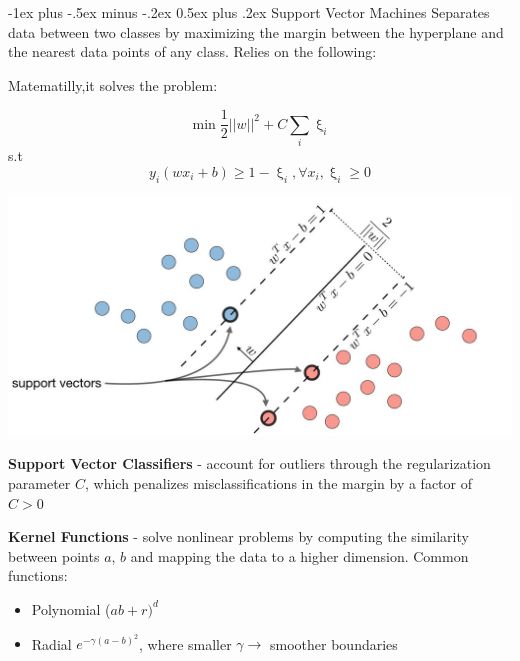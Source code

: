\documentclass[10pt,landscape]{article}
\makeatletter
\renewcommand{\section}{\@startsection{section}{1}{0mm}%
                                {-1ex plus -.5ex minus -.2ex}%
                                {0.5ex plus .2ex}%
                                {\normalfont\large\bfseries}}
\makeatother
\begin{document}
\begin{multicols}{3}
    \section{Support Vector Machines}
    Separates data between two classes by maximizing the margin between the hyperplane and the nearest data points of any class. Relies on the following:

    Matematilly,it solves the problem:

    $$\min \frac{1}{2}||w||^2 + C \sum_i \upxi_i $$
    s.t $$y_i(wx_i+b)\geq 1-\upxi_i, \forall x_i, \upxi_i\geq 0 $$
    \vspace{-2.5mm}
    \begin{center}
        \includegraphics[scale = .23]{images/svmNew2.JPG}
    \end{center}

    \vspace{-2mm}
    \textbf{Support Vector Classifiers} - account for outliers through the regularization parameter $C$, which penalizes misclassifications in the margin by a factor of $C > 0$

    \textbf{Kernel Functions} - solve nonlinear problems by computing the similarity between points $a$, $b$ and mapping the data to a higher dimension. Common functions:
    \begin{itemize}[label={--},leftmargin=4mm]
        \vspace{-1mm}
        \itemsep -.4mm
        \item Polynomial ($ab + r)^d$
        \item Radial $e^{-\gamma(a-b)^2}$, where smaller $\gamma \to$  smoother boundaries
    \end{itemize}


\end{multicols}
\end{document}
